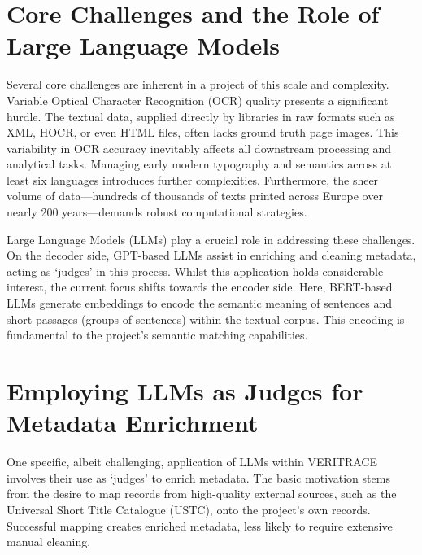 \documentclass[
  letterpaper,
]{book}
\begin{document}
\section{Core Challenges and the Role of Large Language
Models}\label{core-challenges-and-the-role-of-large-language-models}

Several core challenges are inherent in a project of this scale and
complexity. Variable Optical Character Recognition (OCR) quality
presents a significant hurdle. The textual data, supplied directly by
libraries in raw formats such as XML, HOCR, or even HTML files, often
lacks ground truth page images. This variability in OCR accuracy
inevitably affects all downstream processing and analytical tasks.
Managing early modern typography and semantics across at least six
languages introduces further complexities. Furthermore, the sheer volume
of data---hundreds of thousands of texts printed across Europe over
nearly 200 years---demands robust computational strategies.

Large Language Models (LLMs) play a crucial role in addressing these
challenges. On the decoder side, GPT-based LLMs assist in enriching and
cleaning metadata, acting as `judges' in this process. Whilst this
application holds considerable interest, the current focus shifts
towards the encoder side. Here, BERT-based LLMs generate embeddings to
encode the semantic meaning of sentences and short passages (groups of
sentences) within the textual corpus. This encoding is fundamental to
the project's semantic matching capabilities.

\section{Employing LLMs as Judges for Metadata
Enrichment}\label{employing-llms-as-judges-for-metadata-enrichment}

One specific, albeit challenging, application of LLMs within VERITRACE
involves their use as `judges' to enrich metadata. The basic motivation
stems from the desire to map records from high-quality external sources,
such as the Universal Short Title Catalogue (USTC), onto the project's
own records. Successful mapping creates enriched metadata, less likely
to require extensive manual cleaning.
\end{document}
